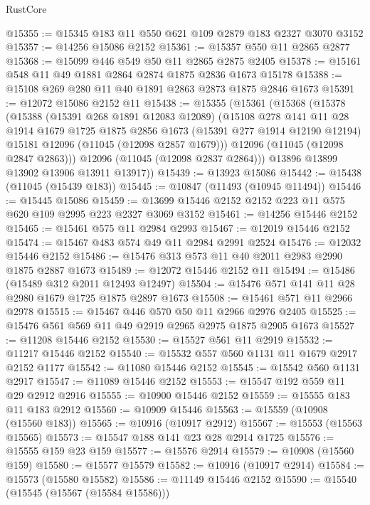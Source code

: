\begin{lexlean}{RustCore}
\begin{coremodule}
@15355 := @15345 @183 @11 @550 @621 @109 @2879 @183 @2327 @3070 @3152
@15357 := @14256 @15086 @2152
@15361 := @15357 @550 @11 @2865 @2877
@15368 := @15099 @446 @549 @50 @11 @2865 @2875 @2405
@15378 := @15161 @548 @11 @49 @1881 @2864 @2874 @1875 @2836 @1673 @15178
@15388 := @15108 @269 @280 @11 @40 @1891 @2863 @2873 @1875 @2846 @1673
@15391 := @12072 @15086 @2152 @11
@15438 := @15355
    (@15361
      (@15368
        (@15378
          (@15388
            (@15391 @268 @1891 @12083 @12089)
            (@15108
              @278
              @141
              @11
              @28
              @1914
              @1679
              @1725
              @1875
              @2856
              @1673
              (@15391 @277 @1914 @12190 @12194)
              @15181
              @12096
              (@11045 (@12098 @2857 @1679)))
            @12096
            (@11045 (@12098 @2847 @2863)))
          @12096
          (@11045 (@12098 @2837 @2864)))
        @13896
        @13899
        @13902
        @13906
        @13911
        @13917))
@15439 := @13923 @15086
@15442 := @15438 (@11045 (@15439 @183))
@15445 := @10847 (@11493 (@10945 @11494))
@15446 := @15445 @15086
@15459 := @13699 @15446 @2152 @2152 @223 @11 @575 @620 @109 @2995 @223 @2327 @3069 @3152
@15461 := @14256 @15446 @2152
@15465 := @15461 @575 @11 @2984 @2993
@15467 := @12019 @15446 @2152
@15474 := @15467 @483 @574 @49 @11 @2984 @2991 @2524
@15476 := @12032 @15446 @2152
@15486 := @15476 @313 @573 @11 @40 @2011 @2983 @2990 @1875 @2887 @1673
@15489 := @12072 @15446 @2152 @11
@15494 := @15486 (@15489 @312 @2011 @12493 @12497)
@15504 := @15476 @571 @141 @11 @28 @2980 @1679 @1725 @1875 @2897 @1673
@15508 := @15461 @571 @11 @2966 @2978
@15515 := @15467 @446 @570 @50 @11 @2966 @2976 @2405
@15525 := @15476 @561 @569 @11 @49 @2919 @2965 @2975 @1875 @2905 @1673
@15527 := @11208 @15446 @2152
@15530 := @15527 @561 @11 @2919
@15532 := @11217 @15446 @2152
@15540 := @15532 @557 @560 @1131 @11 @1679 @2917 @2152 @1177
@15542 := @11080 @15446 @2152
@15545 := @15542 @560 @1131 @2917
@15547 := @11089 @15446 @2152
@15553 := @15547 @192 @559 @11 @29 @2912 @2916
@15555 := @10900 @15446 @2152
@15559 := @15555 @183 @11 @183 @2912
@15560 := @10909 @15446
@15563 := @15559 (@10908 (@15560 @183))
@15565 := @10916 (@10917 @2912)
@15567 := @15553 (@15563 @15565)
@15573 := @15547 @188 @141 @23 @28 @2914 @1725
@15576 := @15555 @159 @23 @159
@15577 := @15576 @2914
@15579 := @10908 (@15560 @159)
@15580 := @15577 @15579
@15582 := @10916 (@10917 @2914)
@15584 := @15573 (@15580 @15582)
@15586 := @11149 @15446 @2152
@15590 := @15540 (@15545 (@15567 (@15584 @15586)))

\end{coremodule}
\end{lexlean}
